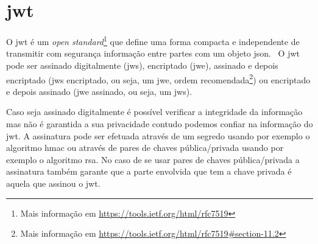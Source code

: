 




\section{\acrfull{jwt}}
O \acrshort{jwt} é um \textit{open standard}\footnote{Mais informação em \url{https://tools.ietf.org/html/rfc7519}} que define uma forma compacta e independente de transmitir com segurança informação entre partes com um objeto \acrshort{json}.~\cite{jwtio} O \acrshort{jwt} pode ser assinado digitalmente (\acrshort{jws}), encriptado (\acrshort{jwe}), assinado e depois encriptado (\acrshort{jws} encriptado, ou seja, um \acrshort{jwe}, ordem recomendada\footnote{Mais informação em \url{https://tools.ietf.org/html/rfc7519\#section-11.2}}) ou encriptado e depois assinado (\acrshort{jwe} assinado, ou seja, um \acrshort{jws}).

Caso seja assinado digitalmente é possível verificar a integridade da informação mas não é garantida a sua privacidade contudo podemos confiar na informação do \acrshort{jwt}. A assinatura pode ser efetuada através de um segredo usando por exemplo o algoritmo \acrshort{hmac} ou através de pares de chaves pública/privada usando por exemplo o algoritmo \acrshort{rsa}. No caso de se usar pares de chaves pública/privada a assinatura também garante que a parte envolvida que tem a chave privada é aquela que assinou o \acrshort{jwt}.

